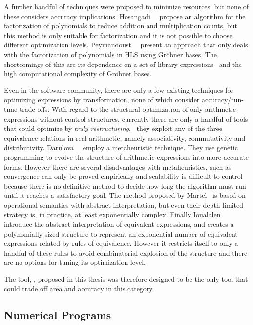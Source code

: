 A further handful of techniques were proposed to minimize resources, but none
of these considers accuracy implications.  Hosangadi~\etal~\cite{hosangadi}
propose an algorithm for the factorization of polynomials to reduce
addition and multiplication counts, but this method is only suitable for
factorization and it is not possible to choose different optimization
levels. Peymandoust~\etal~\cite{peymandoust} present an approach that
only deals with the factorization of polynomials in HLS using Gr{\"o}bner
bases. The shortcomings of this are its dependence on a set of library
expressions~\cite{hosangadi} and the high computational complexity of
Gr{\"o}bner bases.

Even in the software community, there are only a few existing techniques
for optimizing expressions by transformation, none of which consider
accuracy/run-time trade-offs.  With regard to the structural optimization
of only arithmetic expressions without control structures, currently
there are only a handful of tools that could optimize by \emph{truly
restructuring}, \ie~they exploit any of the three equivalence relations in
real arithmetic, namely associativity, commutativity and distributivity.
Darulova~\etal~\cite{darulova} employ a metaheuristic technique. They use
genetic programming to evolve the structure of arithmetic expressions into more
accurate forms. However there are several disadvantages with metaheuristics,
such as convergence can only be proved empirically and scalability is difficult
to control because there is no definitive method to decide how long the
algorithm must run until it reaches a satisfactory goal. The method proposed
by Martel~\cite{martel07} is based on operational semantics with abstract
interpretation, but even their depth limited strategy is, in practice, at least
exponentially complex.  Finally Ioualalen~\etal~\cite{ioualalen} introduce the
abstract interpretation of equivalent expressions, and creates a polynomially
sized structure to represent an exponential number of equivalent expressions
related by rules of equivalence. However it restricts itself to only a handful
of these rules to avoid combinatorial explosion of the structure and there are
no options for tuning its optimization level.

 The tool, \soap{}, proposed in this thesis was therefore
designed to be the only tool that could trade off area and accuracy in this
category.


\subsection{Numerical Programs}
\label{bg:sub:numerical_programs}

